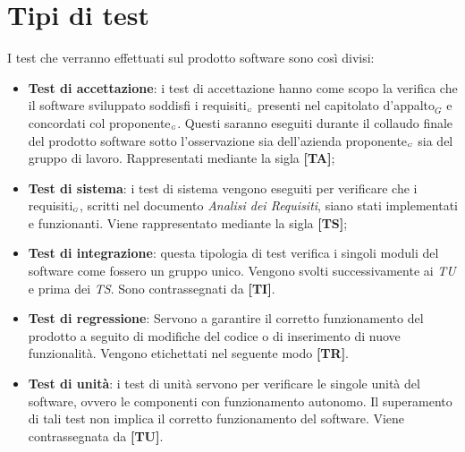 \section{Tipi di test} \label{SpecificaDeiTestTipiDiTest}
I test che verranno effettuati sul prodotto software sono così divisi:
\begin{itemize}
	\item \textbf{Test di accettazione}: i test di accettazione hanno come scopo la verifica che il software sviluppato soddisfi i requisiti$_{\scaleto{G}{3pt}}$ presenti nel capitolato d’appalto$_G$ e concordati col proponente$_{\scaleto{G}{3pt}}$.
	Questi saranno eseguiti durante il collaudo finale del prodotto software sotto l'osservazione sia dell'azienda proponente$_{\scaleto{G}{3pt}}$ sia del gruppo di lavoro.
	Rappresentati mediante la sigla \textbf{[TA]};
	
	\item \textbf{Test di sistema}: i test di sistema vengono eseguiti per verificare che i requisiti$_{\scaleto{G}{3pt}}$, scritti nel documento \textit{Analisi dei Requisiti}, siano stati implementati e funzionanti.
	Viene rappresentato mediante la sigla \textbf{[TS]};
		
	\item \textbf{Test di integrazione}: questa tipologia di test verifica i singoli moduli del software come fossero un gruppo unico.
	Vengono svolti successivamente ai \textit{TU} e prima dei \textit{TS}.
	Sono contrassegnati da \textbf{[TI]}.
	
	\item \textbf{Test di regressione}: Servono a garantire il corretto funzionamento del prodotto a seguito di modifiche del codice o di inserimento di nuove funzionalità.
	Vengono etichettati nel seguente modo \textbf{[TR]}.
	
	\item \textbf{Test di unità}: i test di unità servono per verificare le singole unità del software, ovvero le componenti con funzionamento autonomo.
	Il superamento di tali test non implica il corretto funzionamento del software.
	Viene contrassegnata da \textbf{[TU]}.
\end{itemize}




